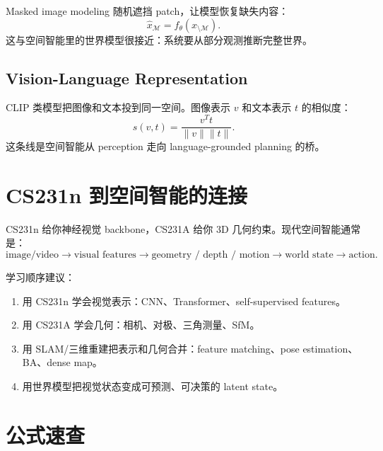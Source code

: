 \documentclass[11pt]{article}
\begin{document}
Masked image modeling 随机遮挡 patch，让模型恢复缺失内容：
\[
  \hat x_{\mathcal M}=f_\theta(x_{\setminus \mathcal M}).
\]
这与空间智能里的世界模型很接近：系统要从部分观测推断完整世界。

\subsection{Vision-Language Representation}

CLIP 类模型把图像和文本投到同一空间。图像表示 $v$ 和文本表示 $t$ 的相似度：
\[
  s(v,t)=\frac{v^Tt}{\|v\|\|t\|}.
\]
这条线是空间智能从 perception 走向 language-grounded planning 的桥。

\section{CS231n 到空间智能的连接}

CS231n 给你神经视觉 backbone，CS231A 给你 3D 几何约束。现代空间智能通常是：
\[
  \text{image/video} \rightarrow \text{visual features}
  \rightarrow \text{geometry / depth / motion}
  \rightarrow \text{world state}
  \rightarrow \text{action}.
\]

学习顺序建议：
\begin{enumerate}
  \item 用 CS231n 学会视觉表示：CNN、Transformer、self-supervised features。
  \item 用 CS231A 学会几何：相机、对极、三角测量、SfM。
  \item 用 SLAM/三维重建把表示和几何合并：feature matching、pose estimation、BA、dense map。
  \item 用世界模型把视觉状态变成可预测、可决策的 latent state。
\end{enumerate}

\section*{公式速查}
\end{document}
